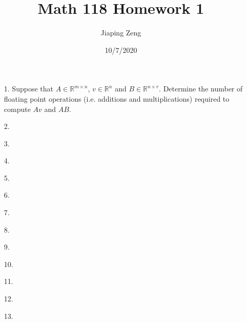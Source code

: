 \documentclass{article}
\title{Math 118 Homework 1}
\date{10/7/2020}
\author{Jiaping Zeng}
\begin{document}
\maketitle

\begin{itemize}
    \item [1.] Suppose that $A\in\mathbb{R}^{m\times n}$, $v\in\mathbb{R}^{n}$ and $B\in\mathbb{R}^{n\times r}$. Determine the number of floating point operations (i.e. additions and multiplications) required to compute $Av$ and $AB$.
    \item [2.]
    \item [3.]
    \item [4.]
    \item [5.]
    \item [6.]
    \item [7.]
    \item [8.]
    \item [9.]
    \item [10.]
    \item [11.]
    \item [12.]
    \item [13.]
\end{itemize}
\end{document}
